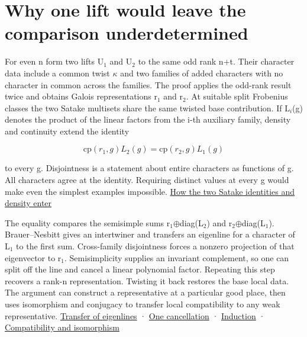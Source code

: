 \documentclass[11pt,letterpaper]{article}
\begin{document}
\section{Why one lift would leave the comparison underdetermined}
For even n form two lifts U\ensuremath{{}_{1}} and U\ensuremath{{}_{2}} to the same odd rank n+t. Their character data include a common twist \ensuremath{\kappa} and two families of added characters with no character in common across the families. The proof applies the odd-rank result twice and obtains Galois representations r\ensuremath{{}_{1}} and r\ensuremath{{}_{2}}. At suitable split Frobenius classes the two Satake multisets share the same twisted base contribution. If L\ensuremath{{}_{i}}(g) denotes the product of the linear factors from the i-th auxiliary family, density and continuity extend the identity

\[\mathrm{cp}(r_1,g)L_2(g)=\mathrm{cp}(r_2,g)L_1(g)\]

to every g. Disjointness is a statement about entire characters as functions of g. All characters agree at the identity. Requiring distinct values at every g would make even the simplest examples impossible. \href{https://github.com/nousentllc/riemann-hypothesis/blob/40e56bab026552e089d7afcfeff08d2defb9c005/src/Development/AutomorphicArithmetic/Foundations/GaloisRepresentations/ThetaParseval/CoreAtQIffRowQ.lean\#L103-L145}{How the two Satake identities and density enter}

The equality compares the semisimple sums r\ensuremath{{}_{1}}\ensuremath{\oplus}diag(L\ensuremath{{}_{2}}) and r\ensuremath{{}_{2}}\ensuremath{\oplus}diag(L\ensuremath{{}_{1}}). Brauer–Nesbitt gives an intertwiner and transfers an eigenline for a character of L\ensuremath{{}_{1}} to the first sum. Cross-family disjointness forces a nonzero projection of that eigenvector to r\ensuremath{{}_{1}}. Semisimplicity supplies an invariant complement, so one can split off the line and cancel a linear polynomial factor. Repeating this step recovers a rank-n representation. Twisting it back restores the base local data. The argument can construct a representative at a particular good place, then uses isomorphism and conjugacy to transfer local compatibility to any weak representative. \href{https://github.com/nousentllc/riemann-hypothesis/blob/40e56bab026552e089d7afcfeff08d2defb9c005/src/Development/AutomorphicArithmetic/Foundations/GaloisRepresentations/ThetaParseval/SplitLineSubtraction/PEigTransfer.lean\#L13-L34}{Transfer of eigenlines} · \href{https://github.com/nousentllc/riemann-hypothesis/blob/40e56bab026552e089d7afcfeff08d2defb9c005/src/Development/AutomorphicArithmetic/Foundations/GaloisRepresentations/ThetaParseval/SplitLineSubtraction/PPeelOne.lean\#L13-L42}{One cancellation} · \href{https://github.com/nousentllc/riemann-hypothesis/blob/40e56bab026552e089d7afcfeff08d2defb9c005/src/Development/AutomorphicArithmetic/Foundations/GaloisRepresentations/ThetaParseval/SplitLineSubtraction/PPeelAll.lean\#L17-L50}{Induction} · \href{https://github.com/nousentllc/riemann-hypothesis/blob/40e56bab026552e089d7afcfeff08d2defb9c005/src/Development/AutomorphicArithmetic/Foundations/GaloisRepresentations/ThetaParseval/CoreAtQIffRowQ.lean\#L195-L209}{Compatibility and isomorphism}
\end{document}
